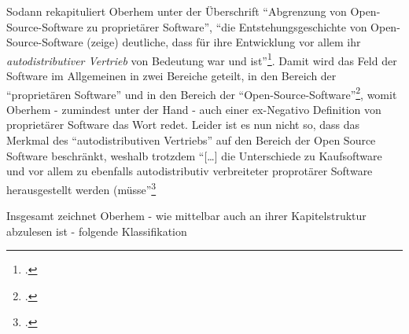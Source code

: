 \documentclass[DIV=calc,BCOR=5mm,11pt,headings=small,oneside,abstract=true, toc=bib]{scrartcl}
\begin{document}
Sodann rekapituliert Oberhem unter der Überschrift \enquote{Abgrenzung von
Open-Source-Software zu proprietärer Software}, \enquote{die
Entstehungsgeschichte von Open-Source-Software (zeige) deutliche, dass für ihre
Entwicklung vor allem ihr \textit{autodistributiver Vertrieb} von Bedeutung war
und ist}\footcite[vgl.][27]{Oberhem2008a}. Damit wird das Feld der
Software im Allgemeinen in zwei Bereiche geteilt, in den Bereich der
\enquote{proprietären Software} und in den Bereich der
\enquote{Open-Source-Software}\footcite[vgl.][27]{Oberhem2008a}, womit
Oberhem - zumindest unter der Hand - auch einer ex-Negativo Definition von
proprietärer Software das Wort redet. Leider ist es nun nicht so, dass das
Merkmal des \enquote{autodistributiven Vertriebs} auf den Bereich der Open
Source Software beschränkt, weshalb trotzdem \enquote{[\ldots] die
Unterschiede zu Kaufsoftware und vor allem zu ebenfalls autodistributiv
verbreiteter proprotärer Software herausgestellt werden
(müsse}\footcite[vgl.][27. BTW: Dieser 'Begriff' des 'autodistributiven
Vertriebs' klingt sicher gut, erhellt aber wenig. Zunächst wird er schwer den
Verdacht des Oxymorons loswerden. Distribution von Software ist irgendwie ja
auch Vertrieb - und umgekehrt. Und dann verteilt sich Software nicht selbst. Es
sind immer Menschen, die sich Software herunterladen oder gar anderen zusenden.
Es gibt schwerlich ein 'auto' in dieser Art der Distribution. Wir werden den
Begriff des 'autodistributiven Vertriebs' deshlab auch nicht weiter verfolgen,
so verführerisch er sich zunächst auch anbietet.]{Oberhem2008a}

Insgesamt zeichnet Oberhem - wie mittelbar auch an ihrer Kapitelstruktur
abzulesen ist - folgende Klassifikation
\end{document}
